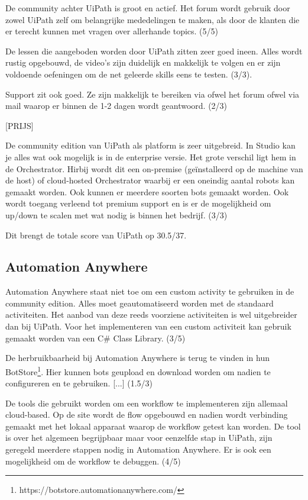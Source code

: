 De community achter UiPath is groot en actief. Het forum wordt gebruik door zowel UiPath zelf om belangrijke mededelingen te maken, als door de klanten die er terecht kunnen met vragen over allerhande topics. (5/5)

De lessen die aangeboden worden door UiPath zitten zeer goed ineen. Alles wordt rustig opgebouwd, de video's zijn duidelijk en makkelijk te volgen en er zijn voldoende oefeningen om de net geleerde skills eens te testen. (3/3).

Support zit ook goed. Ze zijn makkelijk te bereiken via ofwel het forum ofwel via mail waarop er binnen de 1-2 dagen wordt geantwoord. (2/3)

[PRIJS]

De community edition van UiPath als platform is zeer uitgebreid. In Studio kan je alles wat ook mogelijk is in de enterprise versie. Het grote verschil ligt hem in de Orchestrator. Hirbij wordt dit een on-premise (geïnstalleerd op de machine van de host) of cloud-hosted Orchestrator waarbij er een oneindig aantal robots kan gemaakt worden. Ook kunnen er meerdere soorten bots gemaakt worden. Ook wordt toegang verleend tot premium support en is er de mogelijkheid om up/down te scalen met wat nodig is binnen het bedrijf. (3/3)

Dit brengt de totale score van UiPath op 30.5/37.

\subsection{Automation Anywhere}
Automation Anywhere staat niet toe om een custom activity te gebruiken in de community edition. Alles moet geautomatiseerd worden met de standaard activiteiten. Het aanbod van deze reeds voorziene activiteiten is wel uitgebreider dan bij UiPath. Voor het implementeren van een custom activiteit kan gebruik gemaakt worden van een C\# Class Library. (3/5)

De herbruikbaarheid bij Automation Anywhere is terug te vinden in hun BotStore\footnote{https://botstore.automationanywhere.com/}. Hier kunnen bots geupload en download worden om nadien te configureren en te gebruiken. [...] (1.5/3)

De tools die gebruikt worden om een workflow te implementeren zijn allemaal cloud-based. Op de site wordt de flow opgebouwd en nadien wordt verbinding gemaakt met het lokaal apparaat waarop de workflow getest kan worden. De tool is over het algemeen begrijpbaar maar voor eenzelfde stap in UiPath, zijn geregeld meerdere stappen nodig in Automation Anywhere. Er is ook een mogelijkheid om de workflow te debuggen. (4/5)

